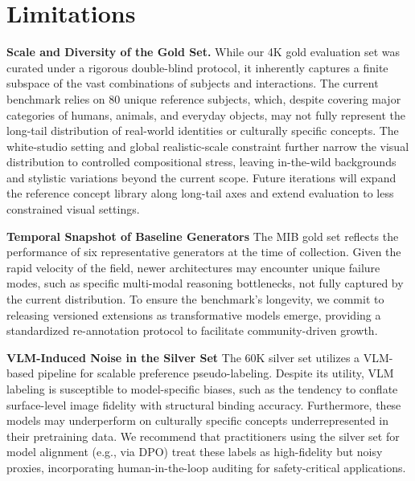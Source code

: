 \documentclass{article}
\begin{document}
\section{Limitations}

\textbf{Scale and Diversity of the Gold Set.} While our 4K gold evaluation set was curated under a rigorous double-blind protocol, it inherently captures a finite subspace of the vast combinations of subjects and interactions. The current benchmark relies on 80 unique reference subjects, which, despite covering major categories of humans, animals, and everyday objects, may not fully represent the long-tail distribution of real-world identities or culturally specific concepts. The white-studio setting and global realistic-scale constraint further narrow the visual distribution to controlled compositional stress, leaving in-the-wild backgrounds and stylistic variations beyond the current scope. Future iterations will expand the reference concept library along long-tail axes and extend evaluation to less constrained visual settings.

\textbf{Temporal Snapshot of Baseline Generators} 
The MIB gold set reflects the performance of six representative generators at the time of collection. 
Given the rapid velocity of the field, newer architectures may encounter unique failure modes, such as specific multi-modal reasoning bottlenecks, not fully captured by the current distribution. 
To ensure the benchmark’s longevity, we commit to releasing versioned extensions as transformative models emerge, providing a standardized re-annotation protocol to facilitate community-driven growth.

\textbf{VLM-Induced Noise in the Silver Set} 
The 60K silver set utilizes a VLM-based pipeline for scalable preference pseudo-labeling. Despite its utility, VLM labeling is susceptible to model-specific biases, such as the tendency to conflate surface-level image fidelity with structural binding accuracy. 
Furthermore, these models may underperform on culturally specific concepts underrepresented in their pretraining data. We recommend that practitioners using the silver set for model alignment (e.g., via DPO) treat these labels as high-fidelity but noisy proxies, incorporating human-in-the-loop auditing for safety-critical applications.
\end{document}
